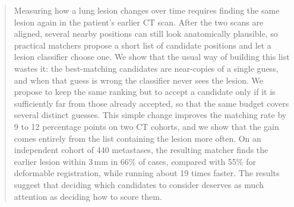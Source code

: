\begin{abstract}
Measuring how a lung lesion changes over time requires finding the same lesion again in the patient's earlier CT scan.
After the two scans are aligned, several nearby positions can still look anatomically plausible, so practical matchers propose a short list of candidate positions and let a lesion classifier choose one.
We show that the usual way of building this list wastes it: the best-matching candidates are near-copies of a single guess, and when that guess is wrong the classifier never sees the lesion.
We propose to keep the same ranking but to accept a candidate only if it is sufficiently far from those already accepted, so that the same budget covers several distinct guesses.
This simple change improves the matching rate by 9 to 12 percentage points on two CT cohorts, and we show that the gain comes entirely from the list containing the lesion more often.
On an independent cohort of 440 metastases, the resulting matcher finds the earlier lesion within 3\,mm in 66\% of cases, compared with 55\% for deformable registration, while running about 19 times faster.
The results suggest that deciding which candidates to consider deserves as much attention as deciding how to score them.
\end{abstract}
